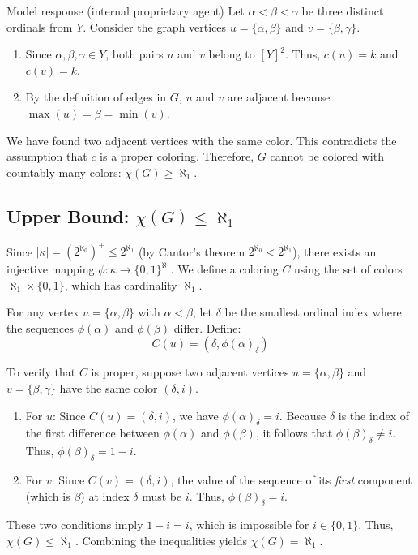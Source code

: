 \documentclass[11pt]{article}
\begin{document}
\begin{solution}{Model response (internal proprietary agent)}
Let $\alpha < \beta < \gamma$ be three distinct ordinals from $Y$. Consider the graph vertices $u = \{\alpha, \beta\}$ and $v = \{\beta, \gamma\}$.
\begin{enumerate}
    \item Since $\alpha, \beta, \gamma \in Y$, both pairs $u$ and $v$ belong to $[Y]^2$. Thus, $c(u) = k$ and $c(v) = k$.
    \item By the definition of edges in $G$, $u$ and $v$ are adjacent because $\max(u) = \beta = \min(v)$.
\end{enumerate}

We have found two adjacent vertices with the same color. This contradicts the assumption that $c$ is a proper coloring. Therefore, $G$ cannot be colored with countably many colors: $\chi(G) \ge \aleph_1$.

\subsection*{Upper Bound: $\chi(G) \le \aleph_1$}

Since $|\kappa| = (2^{\aleph_0})^+ \le 2^{\aleph_1}$ (by Cantor's theorem $2^{\aleph_0} < 2^{\aleph_1}$), there exists an injective mapping $\phi: \kappa \to \{0, 1\}^{\aleph_1}$. We define a coloring $C$ using the set of colors $\aleph_1 \times \{0, 1\}$, which has cardinality $\aleph_1$.

For any vertex $u = \{\alpha, \beta\}$ with $\alpha < \beta$, let $\delta$ be the smallest ordinal index where the sequences $\phi(\alpha)$ and $\phi(\beta)$ differ. Define:
\[ C(u) = (\delta, \phi(\alpha)_\delta) \]

To verify that $C$ is proper, suppose two adjacent vertices $u = \{\alpha, \beta\}$ and $v = \{\beta, \gamma\}$ have the same color $(\delta, i)$.
\begin{enumerate}
    \item For $u$: Since $C(u) = (\delta, i)$, we have $\phi(\alpha)_\delta = i$. Because $\delta$ is the index of the first difference between $\phi(\alpha)$ and $\phi(\beta)$, it follows that $\phi(\beta)_\delta \neq i$. Thus, $\phi(\beta)_\delta = 1 - i$.
    \item For $v$: Since $C(v) = (\delta, i)$, the value of the sequence of its \textit{first} component (which is $\beta$) at index $\delta$ must be $i$. Thus, $\phi(\beta)_\delta = i$.
\end{enumerate}

These two conditions imply $1 - i = i$, which is impossible for $i \in \{0, 1\}$. Thus, $\chi(G) \le \aleph_1$. Combining the inequalities yields $\chi(G) = \aleph_1$.


\end{solution}
\end{document}
